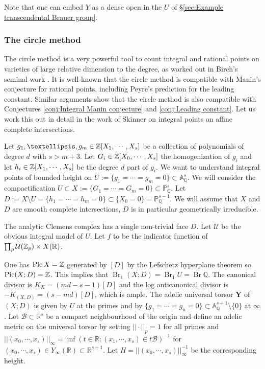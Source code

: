 \documentclass[a4paper,11pt,reqno]{amsart}
\newcommand{\Q}{\mathbb{Q}}
\newcommand{\R}{\mathbb{R}}
\newcommand{\A}{\mathbb{A}}
\newcommand{\Proj}{\mathbb{P}}
\DeclareMathOperator{\Pic}{Pic}
\DeclareMathOperator{\Br}{Br}
\theoremstyle{definition}
\begin{document}
Note that one can embed $Y$ as a dense open in the $U$ of \S\ref{sec:Example transcendental Brauer group}. 
\subsubsection{The circle method}
The circle method is a very powerful tool to count integral and rational points on varieties of large relative dimension to the degree, as worked out in Birch's seminal work \cite{Birch61Forms}. It is well-known \cite[Prop.~4.2.1]{Peyre1995Hauteurs} that the circle method is compatible with Manin's conjecture for rational points, including Peyre's prediction for the leading constant. Similar arguments show that the circle method is also compatible with Conjectures \ref{conj:Integral Manin conjecture} and \ref{conj:Leading constant}. Let us work this out in detail in the work of Skinner \cite{Skinner1997Forms} on integral points on affine complete intersections.

Let $g_1, \dots, g_m \in \Z[X_1, \cdots, X_s]$ be a collection of polynomials of degree $d$ with $s > m + 3$. Let $G_i \in \mathbb{Z}[X_0, \cdots, X_s]$ the homogenization of $g_i$ and let $h_i \in \mathbb{Z}[X_1, \cdots, X_s]$ be the degree $d$ part of $g_i$. We want to understand integral points of bounded height on $U := \{g_1 = \cdots = g_m = 0\} \subset \A_{\Q}^s$. We will consider the compactification $U \subset X := \{G_1 = \cdots = G_m = 0\} \subset \Proj_{\Q}^s$. Let $D := X \setminus U = \{h_1 = \cdots = h_m = 0\} \subset \{X_0 = 0\} = \Proj_{\Q}^{s - 1}$. We will assume that $X$ and $D$ are smooth complete intersections, $D$ is in particular geometrically irreducible.

The analytic Clemens complex has a single non-trivial face $D$. Let $\mathcal{U}$ be the obvious integral model of $U$. Let $f$ to be the indicator function of $\prod_p \mathcal{U}(\Z_p) \times X(\R)$. 

One has $\Pic X = \Z$ generated by $[D]$ by the Lefschetz hyperplane theorem so $\Pic(X ; D) = \Z$. This implies that $\Br_1 (X ;D) = \Br_1 U = \Br \Q$. The canonical divisor is $K_X = (md - s - 1)[D]$ and the log anticanonical divisor is $-K_{(X, D)} = (s - md)[D]$, which is ample. The adelic universal torsor $\mathbf{Y}$ of $(X ; D)$ is given by $U$ at the primes and by $\{g_1 = \cdots = g_n = 0\} \subset \A^{s + 1}_{\Q} \setminus \{0\}$ at $\infty$. Let $\mathcal{B} \subset \R^{s}$ be a compact neighbourhood of the origin and define an adelic metric on the universal torsor by setting $||\cdot||_p = 1$ for all primes and $||(x_0, \cdots, x_s)||_{\infty} = \inf(t \in \R: (x_1, \cdots, x_{s}) \in t\mathcal{B})^{-1}$ for $(x_0, \cdots, x_s) \in Y_{\infty}(\R) \subset \R^{s + 1}$. Let $H = ||(x_0, \cdots, x_s)||_{\infty}^{-1}$ be the corresponding height.
\end{document}
